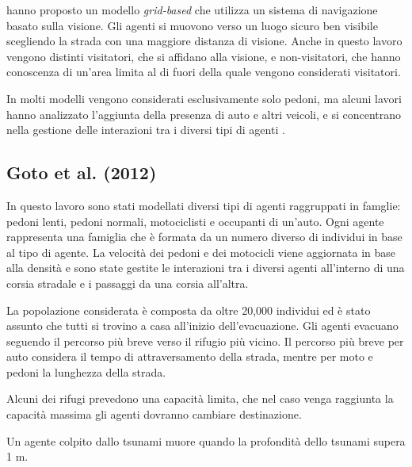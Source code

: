 \textcite{wijerathne2013hpc} hanno proposto un modello \textit{grid-based} che utilizza un sistema di navigazione basato
sulla visione. Gli agenti si muovono verso un luogo sicuro ben visibile scegliendo la strada con una maggiore distanza di visione.
%
Anche in questo lavoro vengono distinti visitatori, che si affidano alla visione, e non-visitatori, che hanno conoscenza di un'area
limita al di fuori della quale vengono considerati visitatori.

In molti modelli vengono considerati esclusivamente solo pedoni, ma alcuni lavori hanno analizzato l'aggiunta della presenza di auto e altri veicoli,
e si concentrano nella gestione delle interazioni tra i diversi tipi di agenti \parencite{goto2012tsunami, wang2016agent, wang2021novel}.


\subsection{Goto et al. (2012)}
In questo lavoro sono stati modellati diversi tipi di agenti raggruppati in famglie: pedoni lenti, pedoni normali, motociclisti e occupanti di un'auto.
Ogni agente rappresenta una famiglia che è formata da un numero diverso di individui in base al tipo di agente.
%
La velocità dei pedoni e dei motocicli viene aggiornata in base alla densità
e sono state gestite le interazioni tra i diversi agenti all'interno di una corsia stradale e i passaggi da una corsia all'altra.

La popolazione considerata è composta da oltre 20,000 individui ed è stato assunto che tutti si trovino a casa all'inizio dell'evacuazione.
%
Gli agenti evacuano seguendo il percorso più breve verso il rifugio più vicino. 
Il percorso più breve per auto considera il tempo di attraversamento della strada, mentre per 
moto e pedoni la lunghezza della strada.

Alcuni dei rifugi prevedono una capacità limita, che nel caso venga raggiunta la capacità massima gli agenti dovranno cambiare destinazione.

Un agente colpito dallo tsunami muore quando la profondità dello tsunami supera 1 m.


